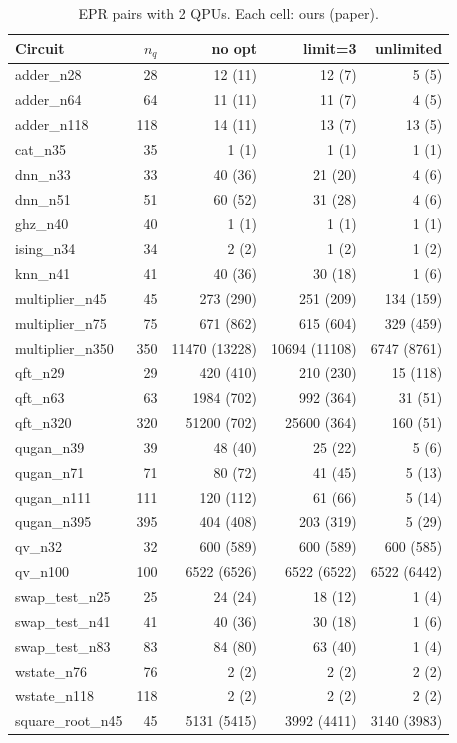 \begin{table}[ht]
\centering
\begin{tabular}{lrrrr}
\hline
Circuit & $n_q$ & no opt & limit=3 & unlimited \\
\hline
adder\_n28 & 28 & 12 (11) & 12 (7) & 5 (5) \\
adder\_n64 & 64 & 11 (11) & 11 (7) & 4 (5) \\
adder\_n118 & 118 & 14 (11) & 13 (7) & 13 (5) \\
cat\_n35 & 35 & 1 (1) & 1 (1) & 1 (1) \\
dnn\_n33 & 33 & 40 (36) & 21 (20) & 4 (6) \\
dnn\_n51 & 51 & 60 (52) & 31 (28) & 4 (6) \\
ghz\_n40 & 40 & 1 (1) & 1 (1) & 1 (1) \\
ising\_n34 & 34 & 2 (2) & 1 (2) & 1 (2) \\
knn\_n41 & 41 & 40 (36) & 30 (18) & 1 (6) \\
multiplier\_n45 & 45 & 273 (290) & 251 (209) & 134 (159) \\
multiplier\_n75 & 75 & 671 (862) & 615 (604) & 329 (459) \\
multiplier\_n350 & 350 & 11470 (13228) & 10694 (11108) & 6747 (8761) \\
qft\_n29 & 29 & 420 (410) & 210 (230) & 15 (118) \\
qft\_n63 & 63 & 1984 (702) & 992 (364) & 31 (51) \\
qft\_n320 & 320 & 51200 (702) & 25600 (364) & 160 (51) \\
qugan\_n39 & 39 & 48 (40) & 25 (22) & 5 (6) \\
qugan\_n71 & 71 & 80 (72) & 41 (45) & 5 (13) \\
qugan\_n111 & 111 & 120 (112) & 61 (66) & 5 (14) \\
qugan\_n395 & 395 & 404 (408) & 203 (319) & 5 (29) \\
qv\_n32 & 32 & 600 (589) & 600 (589) & 600 (585) \\
qv\_n100 & 100 & 6522 (6526) & 6522 (6522) & 6522 (6442) \\
swap\_test\_n25 & 25 & 24 (24) & 18 (12) & 1 (4) \\
swap\_test\_n41 & 41 & 40 (36) & 30 (18) & 1 (6) \\
swap\_test\_n83 & 83 & 84 (80) & 63 (40) & 1 (4) \\
wstate\_n76 & 76 & 2 (2) & 2 (2) & 2 (2) \\
wstate\_n118 & 118 & 2 (2) & 2 (2) & 2 (2) \\
square\_root\_n45 & 45 & 5131 (5415) & 3992 (4411) & 3140 (3983) \\
\hline
\end{tabular}
\caption{EPR pairs with 2 QPUs. Each cell: ours (paper).}
\end{table}
